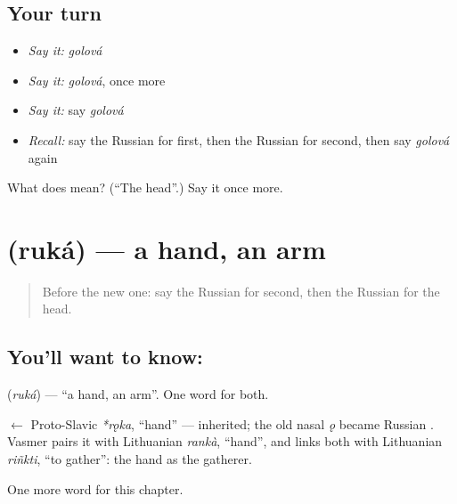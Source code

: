\subsection*{Your turn}
\begin{itemize}
\raggedright
  \item \emph{Say it:} \emph{golová}
  \item \emph{Say it:} \emph{golová}, once more
  \item \emph{Say it:} say \emph{golová}
  \item \emph{Recall:} say the Russian for first, then the Russian for second, then say \emph{golová} again
\end{itemize}

\begin{tcolorbox}[breakable,colback=teal!4,colframe=teal!35!black,title={Before you move on}]
What does  mean? (\textquotedblleft{}The head\textquotedblright{}.) Say it once more.
\end{tcolorbox}
\section[\texorpdfstring{\ru{рука} (ruká)}{рука (ruká)}]{ (ruká) — a hand, an arm}

\label{lesson:RU-C29-hand}



\begin{quote}
Before the new one: say the Russian for second, then the Russian for the head.
\end{quote}

\subsection*{You'll want to know: }
\textbf{} (\emph{ruká}) — \textquotedblleft{}a hand, an arm\textquotedblright{}. One word for both.

\begin{cousinweb}
\textbf{} $\leftarrow$ Proto-Slavic \emph{*rǫka}, \textquotedblleft{}hand\textquotedblright{} — inherited; the old nasal \emph{ǫ} became Russian \emph{}. Vasmer pairs it with Lithuanian \emph{rankà}, \textquotedblleft{}hand\textquotedblright{}, and links both with Lithuanian \emph{riñkti}, \textquotedblleft{}to gather\textquotedblright{}: the hand as the gatherer.
\end{cousinweb}

\begin{grammarlens}[title={What you've built}]
One more word for this chapter.
\end{grammarlens}

